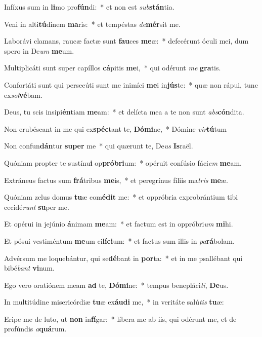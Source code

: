 \item Infíxus sum in \textbf{li}mo pro\textbf{fún}di:~* et non est \textit{sub}\textbf{stán}tia.
\item Veni in alti\textbf{tú}dinem \textbf{ma}ris:~* et tempéstas \textit{de}\textbf{mér}sit me.
\item Laborávi clamans, raucæ factæ sunt \textbf{fau}ces \textbf{me}æ:~* defecérunt óculi mei, dum spero in De\textit{um} \textbf{me}um.
\item Multiplicáti sunt super capíllos \textbf{cá}pitis \textbf{me}i,~* qui odérunt \textit{me} \textbf{gra}tis.
\item Confortáti sunt qui persecúti sunt me inimíci \textbf{me}i in\textbf{jús}te:~* quæ non rápui, tunc ex\textit{sol}\textbf{vé}bam.
\item Deus, tu scis insipi\textbf{én}tiam \textbf{me}am:~* et delícta mea a te non sunt \textit{abs}\textbf{cón}dita.
\item Non erubéscant in me qui ex\textbf{spéc}tant te, \textbf{Dó}\textbf{mi}ne,~* Dómine \textit{vir}\textbf{tú}tum
\item Non confun\textbf{dán}tur \textbf{su}\textbf{per} me~* qui quærunt te, De\textit{us} \textbf{Is}raël.
\item Quóniam propter te sustínu\textbf{i} op\textbf{pró}\textbf{bri}um:~* opéruit confúsio fáci\textit{em} \textbf{me}am.
\item Extráneus factus sum \textbf{frá}tribus \textbf{me}is,~* et peregrínus fíliis ma\textit{tris} \textbf{me}æ.
\item Quóniam zelus domus \textbf{tu}æ com\textbf{é}\textbf{dit} me:~* et oppróbria exprobrántium tibi cecidé\textit{runt} \textbf{su}per me.
\item Et opérui in jejúnio \textbf{á}nimam \textbf{me}am:~* et factum est in oppróbri\textit{um} \textbf{mi}hi.
\item Et pósui vestiméntum \textbf{me}um ci\textbf{lí}\textbf{ci}um:~* et factus sum illis in \textit{pa}\textbf{rá}bolam.
\item Advérsum me loquebántur, qui se\textbf{dé}bant in \textbf{por}ta:~* et in me psallébant qui bibé\textit{bant} \textbf{vi}num.
\item Ego vero oratiónem meam \textbf{ad} te, \textbf{Dó}\textbf{mi}ne:~* tempus benepláci\textit{ti}, \textbf{De}us.
\item In multitúdine misericórdiæ \textbf{tu}æ ex\textbf{áu}\textbf{di} me,~* in veritáte salú\textit{tis} \textbf{tu}æ:
\item Eripe me de luto, ut \textbf{non} in\textbf{fí}gar:~* líbera me ab iis, qui odérunt me, et de profúndis \textit{a}\textbf{quá}rum.

